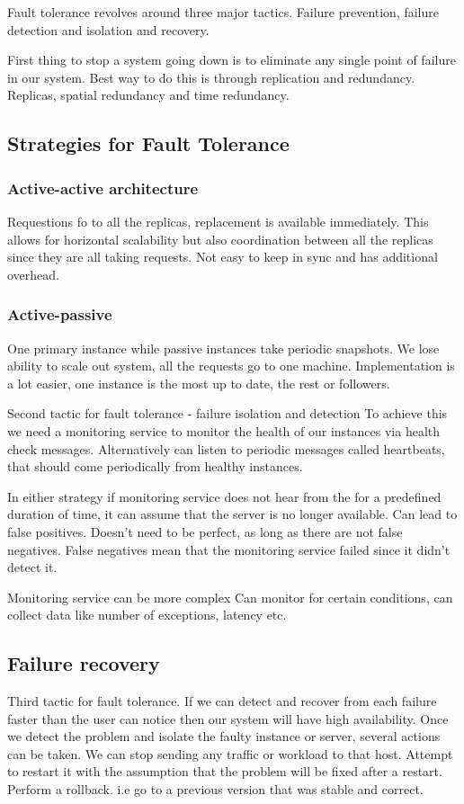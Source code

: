 Fault tolerance revolves around three major tactics.
Failure prevention, failure detection and isolation and recovery.

First thing to stop a system going down is to eliminate any single point of failure in our system.
Best way to do this is through replication and redundancy.
Replicas, spatial redundancy and time redundancy.

\subsection{Strategies for Fault Tolerance}

\subsubsection{Active-active architecture}
Requestions fo to all the replicas, replacement is available immediately.
This allows for horizontal scalability but also coordination between all the replicas since they are all taking requests.
Not easy to keep in sync and has additional overhead.

\subsubsection{Active-passive}
One primary instance while passive instances take periodic snapshots.
We lose ability to scale out system, all the requests go to one machine.
Implementation is a lot easier, one instance is the most up to date, the rest or followers.

Second tactic for fault tolerance - failure isolation and detection
To achieve this we need a monitoring service to monitor the health of our instances via health check messages.
Alternatively can listen to periodic messages called heartbeats, that should come periodically from healthy instances.

In either strategy if monitoring service does not hear from the for a predefined duration of time, it can assume that the server is no longer available.
Can lead to false positives.
Doesn't need to be perfect, as long as there are not false negatives.
False negatives mean that the monitoring service failed since it didn't detect it.

Monitoring service can be more complex
Can monitor for certain conditions, can collect data like number of exceptions, latency etc.

\subsection{Failure recovery}
Third tactic for fault tolerance.
If we can detect and recover from each failure faster than the user can notice then our system will have high availability.
Once we detect the problem and isolate the faulty instance or server, several actions can be taken.
We can stop sending any traffic or workload to that host.
Attempt to restart it with the assumption that the problem will be fixed after a restart.
Perform a rollback.
i.e go to a previous version that was stable and correct.

